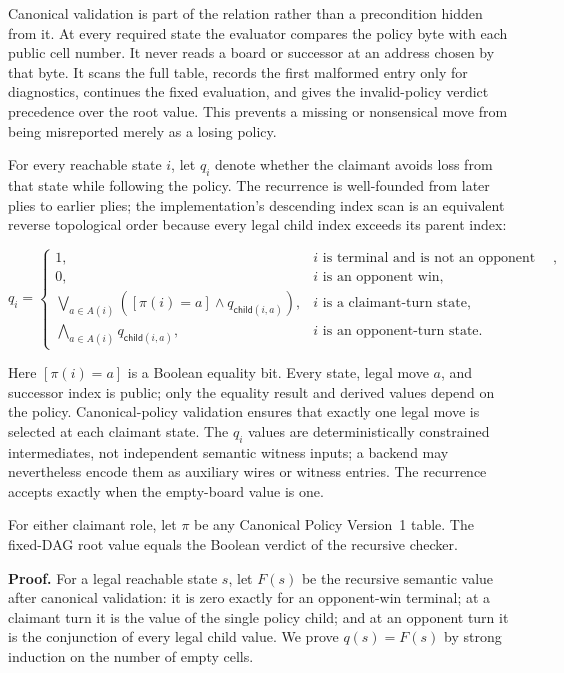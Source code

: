 Canonical validation is part of the relation rather than a precondition hidden
from it. At every required state the evaluator compares the policy byte with
each public cell number. It never reads a board or successor at an address
chosen by that byte. It scans the full table, records the first malformed entry
only for diagnostics, continues the fixed evaluation, and gives the
invalid-policy verdict precedence over the root value. This prevents a missing
or nonsensical move from being misreported merely as a losing policy.

For every reachable state $i$, let $q_i$ denote whether the claimant avoids
loss from that state while following the policy. The recurrence is
well-founded from later plies to earlier plies; the implementation's
descending index scan is an equivalent reverse topological order because every
legal child index exceeds its parent index:

\[
q_i=
\begin{cases}
1, & i\text{ is terminal and is not an opponent win},\\
0, & i\text{ is an opponent win},\\
\displaystyle\bigvee_{a\in A(i)}
 \left([\pi(i)=a]\land q_{\mathsf{child}(i,a)}\right),
    & i\text{ is a claimant-turn state},\\
\displaystyle\bigwedge_{a\in A(i)}q_{\mathsf{child}(i,a)},
    & i\text{ is an opponent-turn state}.
\end{cases}
\]

Here $[\pi(i)=a]$ is a Boolean equality bit. Every state, legal move $a$, and
successor index is public; only the equality result and derived values depend
on the policy. Canonical-policy validation ensures that exactly one legal move
is selected at each claimant state. The $q_i$ values are deterministically
constrained intermediates, not independent semantic witness inputs; a backend
may nevertheless encode them as auxiliary wires or witness entries. The
recurrence accepts exactly when the empty-board value is one.

\begin{proposition}
\label{prop:ttt-dag-equivalence}
For either claimant role, let $\pi$ be any Canonical Policy Version~1 table.
The fixed-DAG root value equals the Boolean verdict of the recursive checker.
\end{proposition}

\textbf{Proof.}
For a legal reachable state $s$, let $F(s)$ be the recursive semantic value
after canonical validation: it is zero exactly for an opponent-win terminal;
at a claimant turn it is the value of the single policy child; and at an
opponent turn it is the conjunction of every legal child value. We prove
$q(s)=F(s)$ by strong induction on the number of empty cells.

